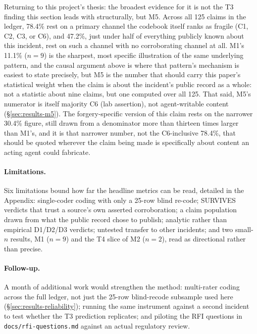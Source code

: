 \documentclass[10pt]{article}
\begin{document}
Returning to this project's thesis: the broadest evidence for it is not
the T3 finding this section leads with structurally, but M5. Across all 125
claims in the ledger, 78.4\% rest on a primary channel the codebook itself
ranks as fragile (C1, C2, C3, or C6), and 47.2\%, just under half of
everything publicly known about this incident, rest on such a channel with
no corroborating channel at all. M1's 11.1\% ($n=9$) is the sharpest, most
specific illustration of the same underlying pattern, and the causal
argument above is where that pattern's mechanism is easiest to state
precisely, but M5 is the number that should carry this paper's statistical
weight when the claim is about the incident's public record as a whole: not
a statistic about nine claims, but one computed over all 125. That said,
M5's numerator is itself majority C6 (lab assertion), not agent-writable
content (\S\ref{sec:results-m5}). The forgery-specific version of this
claim rests on the narrower 30.4\% figure, still drawn from a denominator
more than thirteen times larger than M1's, and it is that narrower number,
not the C6-inclusive 78.4\%, that should be quoted wherever the claim being
made is specifically about content an acting agent could fabricate.

\paragraph{Limitations.} Six limitations bound how far the headline
metrics can be read, detailed in the Appendix: single-coder coding with
only a 25-row blind re-code; SURVIVES verdicts that trust a source's own
asserted corroboration; a claim population drawn from what the public
record chose to publish; analytic rather than empirical D1/D2/D3 verdicts;
untested transfer to other incidents; and two small-$n$ results, M1
($n=9$) and the T4 slice of M2 ($n=2$), read as directional rather than
precise.

\paragraph{Follow-up.} A month of additional work would strengthen the
method: multi-rater coding across the full ledger, not just the 25-row
blind-recode subsample used here (\S\ref{sec:results-reliability}); running
the same instrument against a second incident to test whether the T3
prediction replicates; and piloting the RFI questions in
\texttt{docs/rfi-questions.md} against an actual regulatory review.
\end{document}
